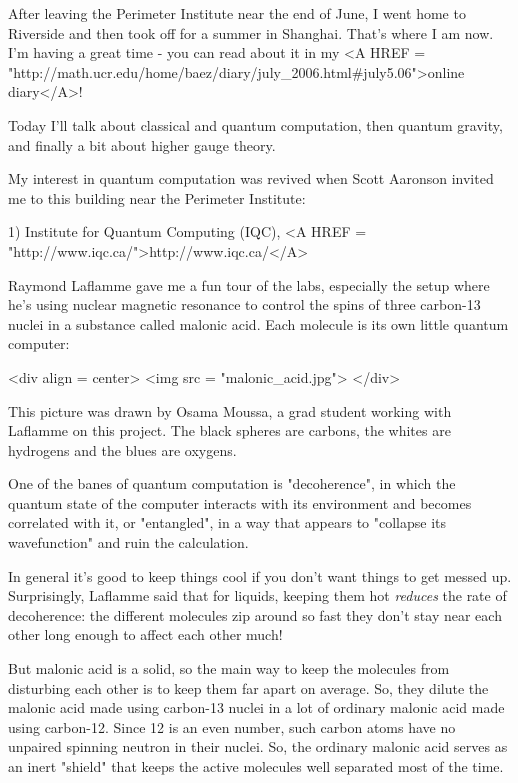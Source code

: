 


After leaving the Perimeter Institute near the end of June, 
I went home to Riverside and then took off for a summer in Shanghai.  
That's where I am now.  I'm having a great time - you can read 
about it in my 
<A HREF = "http://math.ucr.edu/home/baez/diary/july_2006.html#july5.06">online 
diary</A>!

Today I'll talk about classical and quantum computation, then 
quantum gravity, and finally a bit about higher gauge theory.

My interest in quantum computation was revived when Scott
Aaronson invited me to this building near the Perimeter
Institute:

1) Institute for Quantum Computing (IQC), 
<A HREF = "http://www.iqc.ca/">http://www.iqc.ca/</A>

Raymond Laflamme gave me a fun tour of the labs, especially the 
setup where he's using nuclear magnetic resonance to control 
the spins of three carbon-13 nuclei in a substance called malonic
acid.  Each molecule is its own little quantum computer:

<div align = center>
<img src = "malonic_acid.jpg">
</div>

This picture was drawn by Osama Moussa, a grad student working with
Laflamme on this project.  The black spheres are carbons, the whites 
are hydrogens and the blues are oxygens.

One of the banes of quantum computation is "decoherence", in
which the quantum state of the computer interacts with its
environment and becomes correlated with it, or "entangled",
in a way that appears to "collapse its wavefunction" and ruin
the calculation.

In general it's good to keep things cool if you don't want 
things to get messed up.  Surprisingly, Laflamme said that 
for liquids, keeping them hot \emph{reduces} the rate of decoherence:
the different molecules zip around so fast they
don't stay near each other long enough to affect each other much!  

But malonic acid is a solid, so the main way to keep the
molecules from disturbing each other is to keep them far apart
on average.  So, they dilute the malonic acid
made using carbon-13 nuclei in a lot of ordinary malonic acid made using 
carbon-12.  Since 12 is an even number, such carbon atoms have
no unpaired spinning neutron in their nuclei.  So, the ordinary
malonic acid serves as an inert "shield" that keeps the 
active molecules well separated most of the time.

